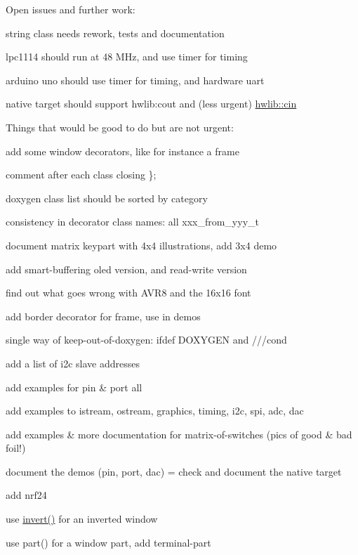 Open issues and further work\+:
\begin{DoxyItemize}
\item string class needs rework, tests and documentation
\item lpc1114 should run at 48 M\+Hz, and use timer for timing
\item arduino uno should use timer for timing, and hardware uart
\item native target should support hwlib\+:cout and (less urgent) \hyperlink{namespacehwlib_ad736b5e00021a29fc5543ec7b36dfe14}{hwlib\+::cin}
\end{DoxyItemize}

Things that would be good to do but are not urgent\+:
\begin{DoxyItemize}
\item add some window decorators, like for instance a frame
\item comment after each class closing \};
\item doxygen class list should be sorted by category
\item consistency in decorator class names\+: all xxx\+\_\+from\+\_\+yyy\+\_\+t
\item document matrix keypart with 4x4 illustrations, add 3x4 demo
\item add smart-\/buffering oled version, and read-\/write version
\item find out what goes wrong with A\+V\+R8 and the 16x16 font
\item add border decorator for frame, use in demos
\item single way of keep-\/out-\/of-\/doxygen\+: ifdef D\+O\+X\+Y\+G\+EN and ///cond
\item add a list of i2c slave addresses
\item add examples for pin \& port \textquotesingle{}all\textquotesingle{}
\item add examples to istream, ostream, graphics, timing, i2c, spi, adc, dac
\item add examples \& more documentation for matrix-\/of-\/switches (pics of good \& bad foil!)
\item document the demo\textquotesingle{}s (pin, port, dac) = check and document the \textquotesingle{}native\textquotesingle{} target
\item add nrf24
\item use \hyperlink{namespacehwlib_ab619d7f70bb62112b2a04192f5103a24}{invert()} for an inverted window
\item use part() for a window part, add terminal-\/part

\end{DoxyItemize}

